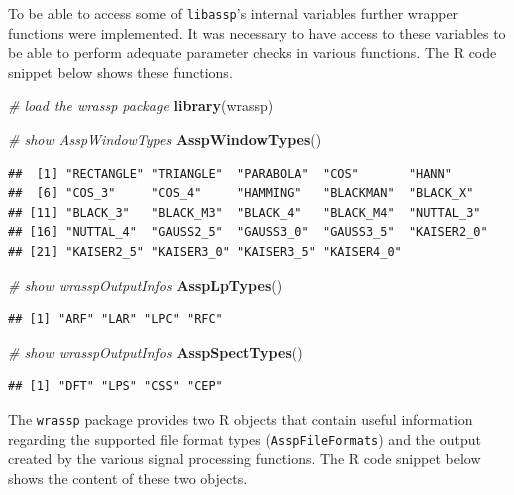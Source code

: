 \documentclass[]{book}
\newenvironment{Shaded}{\begin{snugshade}}{\end{snugshade}}
\newcommand{\CommentTok}[1]{\textcolor[rgb]{0.56,0.35,0.01}{\textit{#1}}}
\newcommand{\KeywordTok}[1]{\textcolor[rgb]{0.13,0.29,0.53}{\textbf{#1}}}
\newcommand{\NormalTok}[1]{#1}
\begin{document}
To be able to access some of \texttt{libassp}'s internal variables further wrapper functions were implemented. It was necessary to have access to these variables to be able to perform adequate parameter checks in various functions. The R code snippet below shows these functions.

\begin{Shaded}
\begin{Highlighting}[]
\CommentTok{# load the wrassp package}
\KeywordTok{library}\NormalTok{(wrassp)}

\CommentTok{# show AsspWindowTypes}
\KeywordTok{AsspWindowTypes}\NormalTok{()}
\end{Highlighting}
\end{Shaded}

\begin{verbatim}
##  [1] "RECTANGLE" "TRIANGLE"  "PARABOLA"  "COS"       "HANN"     
##  [6] "COS_3"     "COS_4"     "HAMMING"   "BLACKMAN"  "BLACK_X"  
## [11] "BLACK_3"   "BLACK_M3"  "BLACK_4"   "BLACK_M4"  "NUTTAL_3" 
## [16] "NUTTAL_4"  "GAUSS2_5"  "GAUSS3_0"  "GAUSS3_5"  "KAISER2_0"
## [21] "KAISER2_5" "KAISER3_0" "KAISER3_5" "KAISER4_0"
\end{verbatim}

\begin{Shaded}
\begin{Highlighting}[]
\CommentTok{# show wrasspOutputInfos}
\KeywordTok{AsspLpTypes}\NormalTok{()}
\end{Highlighting}
\end{Shaded}

\begin{verbatim}
## [1] "ARF" "LAR" "LPC" "RFC"
\end{verbatim}

\begin{Shaded}
\begin{Highlighting}[]
\CommentTok{# show wrasspOutputInfos}
\KeywordTok{AsspSpectTypes}\NormalTok{()}
\end{Highlighting}
\end{Shaded}

\begin{verbatim}
## [1] "DFT" "LPS" "CSS" "CEP"
\end{verbatim}

The \texttt{wrassp} package provides two R objects that contain useful information regarding the supported file format types (\texttt{AsspFileFormats}) and the output created by the various signal processing functions. The R code snippet below shows the content of these two objects.
\end{document}
